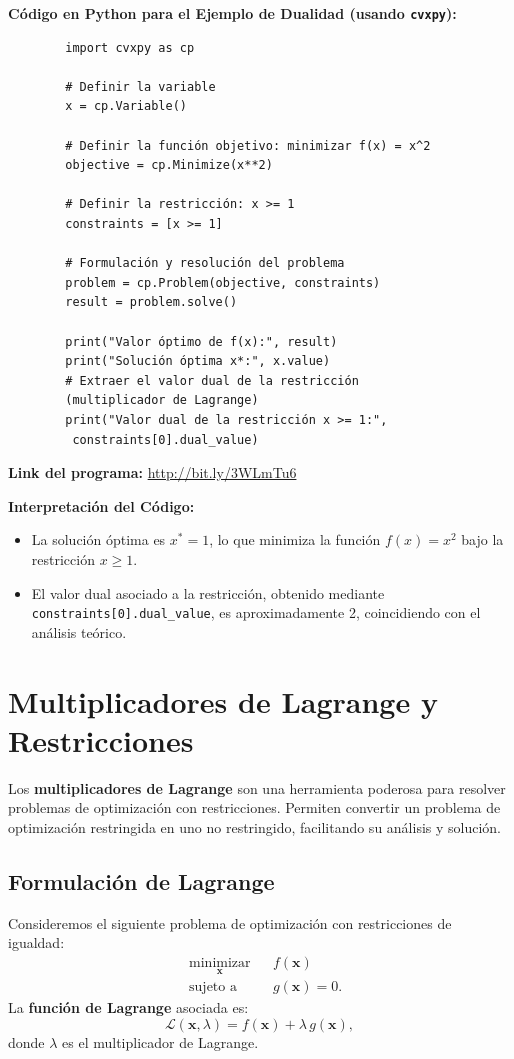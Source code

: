 \documentclass[12pt,a4,oneside]{book}
\begin{document}
	\textbf{Código en Python para el Ejemplo de Dualidad (usando \texttt{cvxpy}):}
	\begin{verbatim}
		import cvxpy as cp
		
		# Definir la variable
		x = cp.Variable()
		
		# Definir la función objetivo: minimizar f(x) = x^2
		objective = cp.Minimize(x**2)
		
		# Definir la restricción: x >= 1
		constraints = [x >= 1]
		
		# Formulación y resolución del problema
		problem = cp.Problem(objective, constraints)
		result = problem.solve()
		
		print("Valor óptimo de f(x):", result)
		print("Solución óptima x*:", x.value)
		# Extraer el valor dual de la restricción 
		(multiplicador de Lagrange)
		print("Valor dual de la restricción x >= 1:",
		 constraints[0].dual_value)
	\end{verbatim}
	
	\textbf{Link del programa:} \url{http://bit.ly/3WLmTu6}
	
	\textbf{Interpretación del Código:}  
	\begin{itemize}
		\item La solución óptima es \(x^* = 1\), lo que minimiza la función \(f(x)=x^2\) bajo la restricción \(x \geq 1\).
		\item El valor dual asociado a la restricción, obtenido mediante \texttt{constraints[0].dual\_value}, es aproximadamente 2, coincidiendo con el análisis teórico.
	\end{itemize}
	
	\section{Multiplicadores de Lagrange y Restricciones}
	
	Los \textbf{multiplicadores de Lagrange} son una herramienta poderosa para resolver problemas de optimización con restricciones. Permiten convertir un problema de optimización restringida en uno no restringido, facilitando su análisis y solución.
	
	\subsection{Formulación de Lagrange}
	
	Consideremos el siguiente problema de optimización con restricciones de igualdad:
	\[
	\begin{aligned}
		& \underset{\mathbf{x}}{\text{minimizar}}
		& & f(\mathbf{x}) \\
		& \text{sujeto a}
		& & g(\mathbf{x}) = 0.
	\end{aligned}
	\]
	La \textbf{función de Lagrange} asociada es:
	\[
	\mathcal{L}(\mathbf{x}, \lambda) = f(\mathbf{x}) + \lambda\, g(\mathbf{x}),
	\]
	donde \(\lambda\) es el multiplicador de Lagrange.
	
\end{document}
